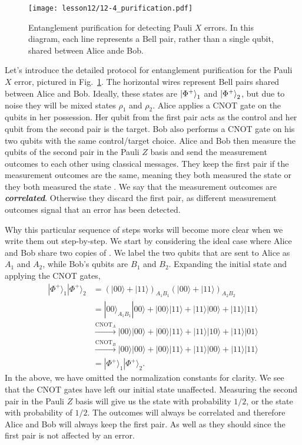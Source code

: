 \begin{figure}[t]
    \centering
    \texttt{[image: lesson12/12-4\_purification.pdf]}
    \caption[Entanglement purification for Pauli X errors.]{Entanglement purification for detecting Pauli $X$ errors. In this diagram, each line represents a Bell pair, rather than a single qubit, shared between Alice ande Bob.}
    \label{fig:12-4_purification}
\end{figure}
Let's introduce the detailed protocol for entanglement purification for the Pauli $X$ error, pictured in Fig.~\ref{fig:12-4_purification}.
The horizontal wires represent Bell pairs shared between Alice and Bob.
Ideally, these states are $\left| \Phi^+ \right\rangle_1$ and  $\left| \Phi^+ \right\rangle_2$, but due to noise they will be mixed states $\rho_1$ and $\rho_2$.
Alice applies a CNOT gate on the qubits in her possession.
Her qubit from the first pair acts as the control and her qubit from the second pair is the target.
Bob also performs a CNOT gate on his two qubits with the same control/target choice.
Alice and Bob then measure the qubits of the second pair in the Pauli $Z$ basis and send the measurement outcomes to each other using classical messages.
They keep the first pair if the measurement outcomes are the same, meaning they both measured the state  or they both measured the state .
We say that the measurement outcomes are \textbf{\emph{correlated}}.
Otherwise they discard the first pair, as different measurement outcomes signal that an error has been detected.

Why this particular sequence of steps works will become more clear when we write them out step-by-step.
We start by considering the ideal case where Alice and Bob share two copies of \ket{\Phi^+}.
We label the two qubits that are sent to Alice as $A_1$ and $A_2$, while Bob's qubits are $B_1$ and $B_2$.
Expanding the initial state and applying the CNOT gates,
\begin{align}
    |\Phi^{+}\rangle_{1} |\Phi^{+}\rangle_{2} & = (|00\rangle + |11\rangle)_{A_1B_1} (|00\rangle + |11\rangle)_{A_2B_2} \nonumber\\
    & = |00\rangle_{A_1B_1} |00\rangle + |00\rangle |11\rangle + |11\rangle |00\rangle +|11\rangle |11\rangle \nonumber\\
    & \stackrel{\mathrm{CNOT}_{A}}{\longrightarrow} |00\rangle|00\rangle+|00\rangle|11\rangle+|11\rangle|10\rangle+|11\rangle|01\rangle \\
    & \stackrel{\mathrm{CNOT}_{B}}{\longrightarrow} |00\rangle|00\rangle+|00\rangle|11\rangle+|11\rangle|00\rangle+|11\rangle|11\rangle \nonumber \\
    & = |\Phi^{+}\rangle_{1} |\Phi^{+}\rangle_{2} \nonumber.
    \label{eq:12-4_purification_ideal}
\end{align}
In the above, we have omitted the normalization constants for clarity.
We see that the CNOT gates have left our initial state unaffected.
Measuring the second pair in the Pauli $Z$ basis will give us the state  with probability $1/2$, or the state  with probability of $1/2$.
The outcomes will always be correlated and therefore Alice and Bob will always keep the first pair.
As well as they should since the first pair is not affected by an error.

